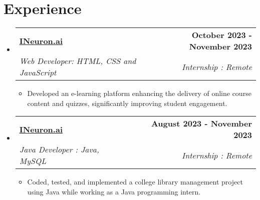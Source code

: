 \documentclass[a4paper,11pt]{article}
\makeatletter
\newcommand{\resumeSubheading}[4]{
  \vspace{-2pt}\item
    \begin{tabular*}{1.0\textwidth}[t]{l@{\extracolsep{\fill}}r}
      \textbf{#1} & \textbf{\small #2} \\
      \textit{\small#3} & \textit{\small #4} \\
    \end{tabular*}\vspace{-7pt}
}
\newcommand{\resumeSubHeadingListStart}{\begin{itemize}[leftmargin=0.0in, label={}]}
\newcommand{\resumeSubHeadingListEnd}{\end{itemize}}
\newcommand{\resumeItemListStart}{\begin{itemize}}
\newcommand{\resumeItemListEnd}{\end{itemize}\vspace{-5pt}}
\makeatother
\begin{document}
\section{Experience}
    \resumeSubHeadingListStart
    \resumeSubheading
		{\href{https://ineuron.ai/}{\underline{INeuron.ai}}}{October 2023 -  November 2023}
		{Web Developer: HTML, CSS and JavaScript}{Internship : Remote}
		\resumeItemListStart
        \item Developed an e-learning platform enhancing the delivery of online course content and quizzes, significantly improving student engagement.
		\resumeItemListEnd
        \resumeSubheading
		{\href{https://ineuron.ai/}{\underline{INeuron.ai}}}{August 2023 -  November 2023}
		{Java Developer : Java, MySQL}{Internship : Remote}
		\resumeItemListStart
        \item Coded, tested, and implemented a college library management project using Java while working as a 
Java programming intern. 
		\resumeItemListEnd
    
 
\resumeSubHeadingListEnd


\vspace{-13pt}
\end{document}
